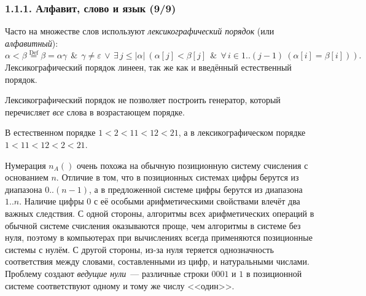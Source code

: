 \documentclass[mathserif,12pt,aspectratio=169]{beamer}
\def\emразделенной{\em разделенной}
\renewcommand{\index}[1]{}
\def\em#1{\it\color{blue}#1}
\def\odmkey#1#2{{\it\color{red} #1}\index{#2}}
\def\Def{\stackrel{\text{Def}}{=}}
\def\A#1#2{\forall\,#1\ \left(#2\right)}
\def\E#1#2{\exists\,#1\ \left(#2\right)}
\def\And{\operatorname{\,\&\,}}
\def\Or{\,\vee\,}
\let\le\leqslant
\begin{document}
\begin{frame}
\frametitle{1.1.1. Алфавит, слово и язык (9/9)}
Часто на множестве слов используют 
\odmkey{лексикографический порядок}{Порядок!лексикографический} (или \odmkey{алфавитный}{Порядок!алфавитный}):\\
$\alpha<\beta\Def \beta=\alpha\gamma\And\gamma\neq\varepsilon 
\Or \E{j\le|\alpha|}{\alpha[j]<
\beta[j]\And\A{i \in 1..(j-1)}{\alpha[i]=
\beta[i]}}.$ 
Лексикогра\-фи\-ческий порядок линеен, так же как и введённый естественный порядок.  

\begin{remark}
Лексикографический порядок не позволяет построить генератор, который перечисляет
{\em все} слова в возрастающем порядке. 
\end{remark}

\begin{example}
В естественном порядке 
$ 1 < 2 <11 <12< 21 $, 
а в лексикографическом порядке 
$1<11<12<2<21$. 
\end{example}

\begin{digress}
Нумерация $n_A()$ очень похожа на 
обычную позиционную
систему счисления с основанием $n$. 
Отличие в том, что в позиционных системах
цифры берутся из диапазона $0..(n-1)$,
а в предложенной системе цифры берутся из
диапазона $1..n$. Наличие цифры $0$ с её 
особыми арифметическими свойствами влечёт два важных следствия. С одной стороны,
алгоритмы 
всех арифметических операций в обычной 
системе счисления
оказываются проще, чем алгоритмы 
в системе без нуля,
поэтому в компьютерах при вычислениях всегда применяются позиционные системы с нулём.
С другой стороны, из-за нуля
теряется однозначность соответствия
между словами, составленными из цифр, 
и натуральными числами. Проблему
создают \odmkey{ведущие нули}{Нуль!ведущий}~---
различные строки $0001$ и $1$ в позиционной системе соответствуют одному и тому же
числу <<один>>.
\end{digress}

\end{frame}
\end{document}
